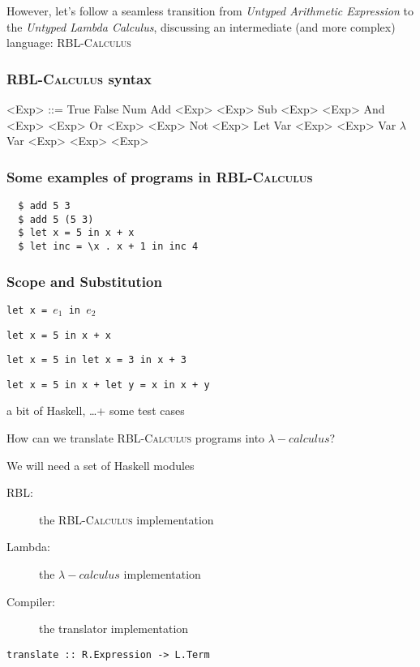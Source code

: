 \documentclass{beamer}
\begin{document}
\begin{frame}
  However, let's follow a seamless
  transition from \emph{Untyped Arithmetic Expression}
  to the \emph{Untyped Lambda Calculus}\pause, discussing
  an intermediate (and more complex) language: \textsc{RBL-Calculus} 
\end{frame}

\begin{frame}
  \frametitle{\textsc{RBL-Calculus} syntax}

\begin{grammar}
  <Exp> ::= True
  \alt False
  \alt Num
  \alt Add <Exp> <Exp> \alt Sub <Exp> <Exp> 
  \alt And <Exp> <Exp> \alt Or <Exp> <Exp> \alt Not <Exp>
  \alt Let Var <Exp> <Exp>
  \alt Var 
  \alt $\lambda$ Var  <Exp>
  \alt <Exp> <Exp> 
\end{grammar}
\end{frame}

\begin{frame}[fragile]
  \frametitle{Some examples of programs in \textsc{RBL-Calculus}}

\begin{verbatim}
  $ add 5 3 
  $ add 5 (5 3) 
  $ let x = 5 in x + x
  $ let inc = \x . x + 1 in inc 4   
\end{verbatim} 
\end{frame}

\begin{frame}
  \frametitle{Scope and Substitution}

  \texttt{let x = $e_1$ in $e_2$} \pause
  
  \texttt{let x = 5 in x + x} \pause 

  \texttt{let x = 5 in let x = 3 in x + 3} \pause  

  \texttt{let x = 5 in x + let y = x in x + y} 

\end{frame}

\begin{frame}
\huge{a bit of Haskell, \ldots + some test cases} 
\end{frame}

\begin{frame}[fragile]
  How can we translate \textsc{RBL-Calculus} programs into
  \textsc{$\lambda-calculus$}?

  \pause

  \begin{block}{We will need a set of Haskell modules}
    \begin{description}
      \item[RBL:] the \textsc{RBL-Calculus} implementation
      \item[Lambda:] the \textsc{$\lambda-calculus$} implementation
      \item[Compiler:] the translator implementation
    \end{description}
  \end{block}

\begin{center}
\begin{verbatim}
translate :: R.Expression -> L.Term
\end{verbatim}
\end{center}
\end{frame}
\end{document}
